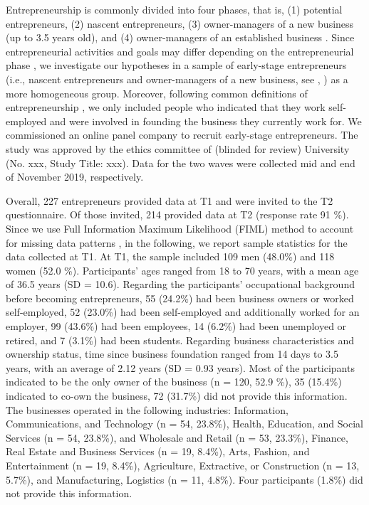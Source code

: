 \documentclass[man]{apa7}
\begin{document}
Entrepreneurship is commonly divided into four phases, that is, (1) potential entrepreneurs, (2) nascent entrepreneurs, (3) owner-managers of a new business (up to 3.5 years old), and (4) owner-managers of an established business \parencite[e.g.,][]{Bosma.2019, Hart2020}.
Since entrepreneurial activities and goals may differ depending on the entrepreneurial phase \parencite[e.g.,][]{Rotefoss.2005, Bosma.2019}, we investigate our hypotheses in a sample of early-stage entrepreneurs (i.e., nascent entrepreneurs and owner-managers of a new business, see \citeauthor{Hart2020}, \citeyear{Hart2020}) as a more homogeneous group.
Moreover, following common definitions of entrepreneurship \parencite[e.g.,][]{Gorgievski2016, Wach2020}, we only included people who indicated that they work self-employed and were involved in founding the business they currently work for. 
We commissioned an online panel company to recruit early-stage entrepreneurs. 
The study was approved by the ethics committee of (blinded for review) University (No. xxx, Study Title: xxx). 
Data for the two waves were collected mid and end of November 2019, respectively. \par 

Overall, 227 entrepreneurs provided data at T1 and were invited to the T2 questionnaire. 
Of those invited, 214 provided data at T2 (response rate 91 \%).
Since we use Full Information Maximum Likelihood (FIML) method to account for missing data patterns \parencite[see, e.g.,][]{Enders2001}, in the following, we report sample statistics for the data collected at T1. 
At T1, the sample included 109 men (48.0\%) and 118 women (52.0 \%). 
Participants’ ages ranged from 18 to 70 years, with a mean age of 36.5 years (SD = 10.6). 
Regarding the participants' occupational background before becoming entrepreneurs, 55 (24.2\%) had been business owners or worked self-employed, 52 (23.0\%) had been self-employed and additionally worked for an employer, 99 (43.6\%) had been employees, 14 (6.2\%) had been unemployed or retired, and 7 (3.1\%) had been students. 
Regarding business characteristics and ownership status, time since business foundation ranged from 14 days to 3.5 years, with an average of 2.12 years (SD = 0.93 years). 
Most of the participants indicated to be the only owner of the business (n = 120, 52.9 \%), 35 (15.4\%) indicated to co-own the business, 72 (31.7\%) did not provide this information. 
The businesses operated in the following industries: Information, Communications, and Technology (n = 54, 23.8\%), Health, Education, and Social Services (n = 54, 23.8\%), and Wholesale and Retail (n = 53, 23.3\%), Finance, Real Estate and Business Services (n = 19, 8.4\%), Arts, Fashion, and Entertainment (n = 19, 8.4\%), Agriculture, Extractive, or Construction (n = 13, 5.7\%), and Manufacturing, Logistics (n = 11, 4.8\%). 
Four participants (1.8\%) did not provide this information.
\end{document}
